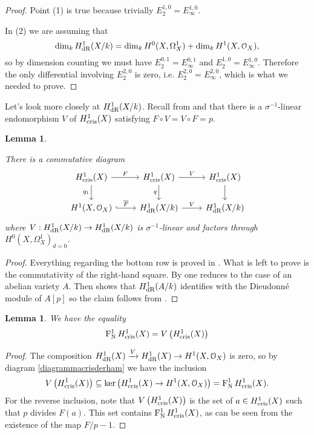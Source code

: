 \documentclass[11pt]{article}
\theoremstyle{plain}
\newtheorem{Lem}[Thm]{Lemma}
\theoremstyle{definition}
\theoremstyle{remark}
\numberwithin{equation}{section}
\newenvironment{lemma}[1]%
    { \begin{Lem} \label{L:#1}}%
    { \end{Lem} }
\newcommand{\lem}[1]{\begin{lemma}{#1} \sl}
\newcommand{\elem}{\end{lemma}}
\newcommand{\prf}{ \begin{proof} }
\newcommand{\epr}{ \end{proof} }
\newcommand\calO{\mathcal{O}}
\newcommand\xto[2]{\xrightarrow[#1]{#2}}
\newcommand\HdR[1]{H^{#1}_{\textnormal{dR}}}                             %
\DeclareMathOperator{\Nyg}{F_N^1}                                      %
\newcommand\Hcris[1]{H^{#1}_{\textnormal{cris}}}                         %
\begin{document}
\prf
    Point (1) is true because trivially $E_2^{1,0}=E_{\infty}^{1,0}$. 
    
    In (2) we are assuming that 
    \[
    \dim_k\HdR{1}(X/k)=\dim_k H^{0}(X,\Omega^1_X)+\dim_k H^{1}(X,\calO_X),
    \]
    so by dimension counting we must have $E^{0,1}_2=E^{0,1}_{\infty}$ and $E^{1,0}_2=E^{1,0}_{\infty}$. Therefore the only differential involving $E^{2,0}_2$ is zero, i.e. $E^{2,0}_2=E^{2,0}_{\infty}$, which is what we needed to prove.
\epr

Let's look more closely at $\HdR{1}(X/k)$. Recall from  and  that there is a $\sigma^{-1}$-linear endomorphism $V$ of $\Hcris{1}(X)$ satisfying $F\circ V=V\circ F=p$.

\lem{diagrammacrisderham}

There is a commutative diagram
\begin{equation}\label{diagrammacrisderham}
    \begin{tikzcd}
	{\Hcris{1}(X)} & {\Hcris{1}(X)} & {\Hcris{1}(X)} \\
	{H^1(X,\calO_X)} & {\HdR{1}(X/k)} & {\HdR{1}(X/k)}
	\arrow["F", from=1-1, to=1-2]
	\arrow["{q_1}"', from=1-1, to=2-1]
	\arrow["V", from=1-2, to=1-3]
	\arrow["q"', from=1-2, to=2-2]
	\arrow[from=1-3, to=2-3]
	\arrow["{\overline{F}}", hook, from=2-1, to=2-2]
	\arrow["V", from=2-2, to=2-3]
\end{tikzcd}
\end{equation}
where $V:\HdR{1}(X/k)\to\HdR{1}(X/k)$ is $\sigma^{-1}$-linear and factors through $H^0(X,\Omega_X^1)_{d=0}$.
\elem
\prf
Everything regarding the bottom row is proved in \cite{oda}. What is left to prove is the commutativity of the right-hand square. By  one reduces to the case of an abelian variety $A$. Then \cite{oda} shows that $\HdR{1}(A/k)$ identifies with the Dieudonné module of $A[p]$ so the claim follows from .
\epr

\lem{nygverschiebung}
We have the equality
\[
\Nyg{}\Hcris{1}(X)=V\left(\Hcris{1}(X)\right)
\]
\elem

\prf
The composition $\HdR{1}(X)\xto{}{V}\HdR{1}(X)\to H^1(X,\calO_X)$ is zero, so by diagram \eqref{diagrammacrisderham} we have the inclusion
\[
V\left(\Hcris{1}(X)\right)\subseteq\ker\left(\Hcris{1}(X)\to H^{1}(X,\calO_X)\right)=\Nyg{}\Hcris{1}(X).
\]
For the reverse inclusion, note that $V\left(\Hcris{1}(X)\right)$ is the set of $a\in\Hcris{1}(X)$ such that $p$ divides $F(a)$. This set contains $\Nyg{}\Hcris{1}(X)$, as can be seen from the existence of the map $F/p-1$.
\epr
\end{document}
